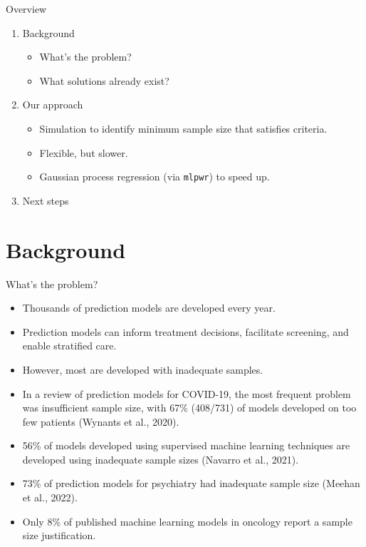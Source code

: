 \documentclass[11pt]{beamer}
\begin{document}
\begin{frame}[t]{Overview}
    \begin{enumerate}
        \item Background
            \begin{itemize}
                \item What's the problem?
                \item What solutions already exist?
            \end{itemize}
        \item Our approach
            \begin{itemize}
                \item Simulation to identify minimum sample size that satisfies criteria.
                \item Flexible, but slower.
                \item Gaussian process regression (via \texttt{mlpwr}) to speed up.
            \end{itemize}
        \item Next steps
    \end{enumerate}
\end{frame}

\section{Background}

\begin{frame}[t]{What's the problem?}

    \begin{itemize}
    \item Thousands of prediction models are developed every year.
    \item Prediction models can inform treatment decisions, facilitate screening, and enable stratified care.
\item  However, most are developed with inadequate samples.
    \end{itemize}

    \begin{itemize}
        \item In a review of prediction models for COVID-19, the most frequent problem was insufficient sample size, with 67\% (408/731) of models developed on too few patients (Wynants et al., 2020).
        \item 56\% of models developed using supervised machine learning techniques are developed using inadequate sample sizes (Navarro et al., 2021).
        \item 73\% of prediction models for psychiatry had inadequate sample size (Meehan et al., 2022).
        \item Only 8\% of published machine learning models in oncology report a sample size justification.
    \end{itemize}
\end{frame}
\end{document}
